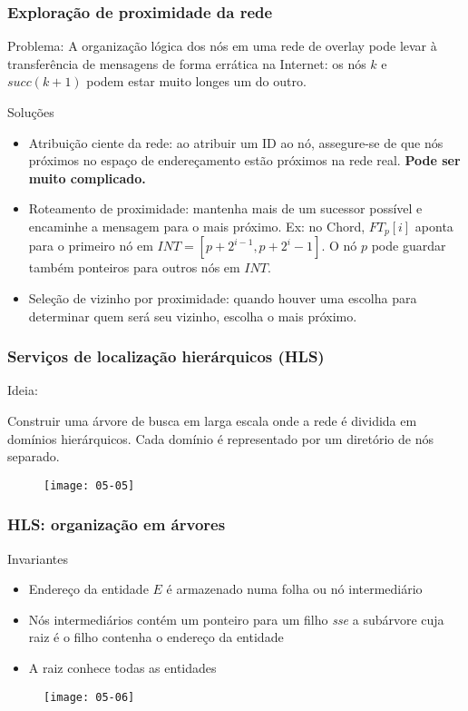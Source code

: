 \documentclass[Ligatures=TeX,table,brazil,svgnames,usetotalslideindicator,compress,10pt]{beamer}
\begin{document}
\begin{frame}
  \frametitle{Exploração de proximidade da rede}
  \begin{block}{Problema:}
A organização lógica dos nós em uma rede de overlay pode levar à transferência de mensagens de forma errática na Internet: os nós $k$ e $succ(k+1)$ podem estar muito longes um do outro.
\end{block}

\begin{block}{Soluções}
\begin{itemize}
    \item<2-> \alert{Atribuição ciente da rede:} ao atribuir um ID ao nó, assegure-se de que nós próximos no espaço de endereçamento estão próximos na rede real. \textbf{Pode ser muito complicado.}
    \item<3-> \alert{Roteamento de proximidade:} mantenha mais de um sucessor possível e encaminhe a mensagem para o mais próximo. Ex: no Chord, $FT_p[i]$ aponta para o primeiro nó em $INT = [p+2^{i-1},p+2^i-1]$. O nó $p$ pode guardar também ponteiros para outros nós em $INT$.
    \item<4-> \alert{Seleção de vizinho por proximidade:} quando houver uma escolha para determinar quem será seu vizinho, escolha o mais próximo.
    \end{itemize}
  \end{block}
\end{frame}

\begin{frame}
  \frametitle{Serviços de localização hierárquicos (HLS)}

  Ideia:
  \begin{block}{}
    Construir uma árvore de busca em larga escala onde a rede é dividida em domínios hierárquicos. Cada domínio é representado por um diretório de nós separado.
  \end{block}

  \begin{figure}
    \centering
    \texttt{[image: 05-05]}
  \end{figure}

\end{frame}

\begin{frame}
  \frametitle{HLS: organização em árvores}
  \begin{block}{Invariantes}
    \begin{itemize}
    \item Endereço da entidade $E$ é armazenado numa folha ou nó intermediário
    \item Nós intermediários contém um ponteiro para um filho \textit{sse} a subárvore cuja raiz é o filho contenha o endereço da entidade
    \item A raiz conhece todas as entidades
    \end{itemize}
  \end{block}

  \begin{figure}
    \centering
    \texttt{[image: 05-06]}
  \end{figure}
\end{frame}
\end{document}
